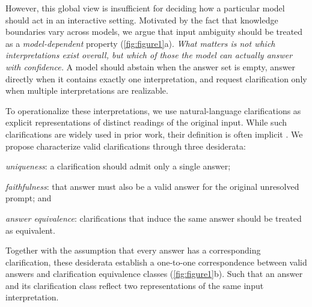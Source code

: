 However, this global view is insufficient for deciding how a particular model should act in an interactive setting.
Motivated by the fact that knowledge boundaries vary across models, we argue that input ambiguity should be treated as a \emph{model-dependent} property (\cref{fig:figure1}a). 
\textit{What matters is not which interpretations exist overall, but which of those the model can actually answer with confidence.}
A model should abstain when the answer set is empty, answer directly when it contains exactly one interpretation, and request clarification only when multiple interpretations are realizable.

To operationalize these interpretations, we use natural-language clarifications \citep{min-etal-2020-ambigqa,kim-etal-2023-tree} as explicit representations of distinct readings of the original input.
While such clarifications are widely used in prior work, their definition is often implicit \citep{pmlr-v235-hou24b,epub135635,rosseeuw2025clara}. We propose characterize valid clarifications through three desiderata:
\begin{inparaenum}[(i)]
    \item \emph{uniqueness}: a clarification should admit only a single answer;
    \item \emph{faithfulness}: that answer must also be a valid answer for the original unresolved prompt; and
    \item \emph{answer equivalence}: clarifications that induce the same answer should be treated as equivalent.
\end{inparaenum}
Together with the assumption that every answer has a corresponding clarification, these desiderata establish a one-to-one correspondence between valid answers and clarification equivalence classes (\cref{fig:figure1}b). 
Such that an answer and its clarification class reflect two representations of the same input interpretation.

